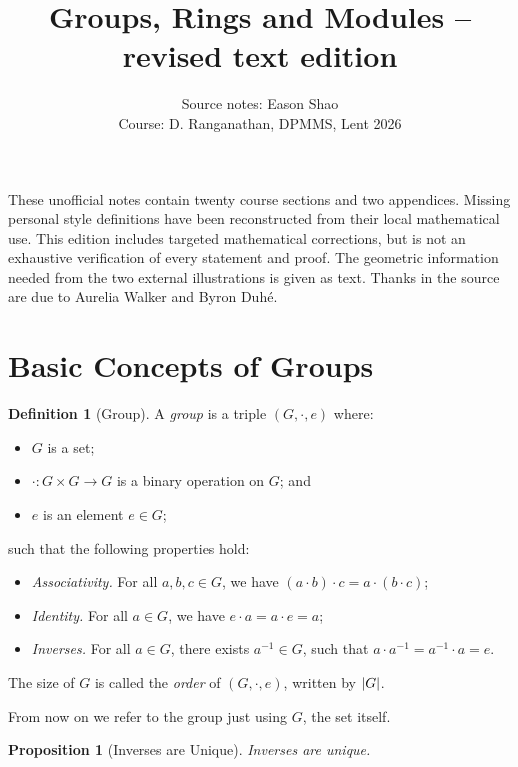 \documentclass{article}
\title{Groups, Rings and Modules -- revised text edition}
\author{Source notes: Eason Shao\\Course: D. Ranganathan, DPMMS, Lent 2026}
\date{}
\newtheorem{proposition}[theorem]{Proposition}
\theoremstyle{definition}
\newtheorem{definition}[theorem]{Definition}
\theoremstyle{remark}
\DeclarePairedDelimiter{\abs}{\lvert}{\rvert}
\newcommand{\pqty}[1]{\left(#1\right)}
\newcommand{\functiondomain}[3]{#1:#2\to #3}
\newcommand{\inverse}{^{-1}}
\begin{document}
\maketitle
These unofficial notes contain twenty course sections and two appendices. Missing personal style definitions have been reconstructed from their local mathematical use. This edition includes targeted mathematical corrections, but is not an exhaustive verification of every statement and proof. The geometric information needed from the two external illustrations is given as text. Thanks in the source are due to Aurelia Walker and Byron Duh\'{e}.
\tableofcontents
\section{Basic Concepts of Groups}

\begin{definition}[Group]
    \label{def:group}%
    A \emph{group} is a triple \(\pqty{G, \cdot, e}\) where:
    \begin{itemize}
        \item \(G\) is a set;
        \item \(\functiondomain{\cdot}{G \times G}{G}\) is a binary operation on \(G\); and
        \item \(e\) is an element \(e \in G\);
    \end{itemize}
    such that the following properties hold:
    \begin{itemize}
        \item \emph{Associativity.} For all \(a, b, c \in G\), we have \(\pqty{a \cdot b} \cdot c = a \cdot \pqty{b \cdot c}\);
        \item \emph{Identity.} For all \(a \in G\), we have \(e \cdot a = a \cdot e = a\);
        \item \emph{Inverses.} For all \(a \in G\), there exists \(a \inverse \in G\), such that \(a \cdot a \inverse = a \inverse \cdot a = e\).
    \end{itemize}

    The size of \(G\) is called the \emph{order} of \(\pqty{G, \cdot, e}\), written by \(\abs{G}\).
\end{definition}

From now on we refer to the group just using \(G\), the set itself.

\begin{proposition}[Inverses are Unique]
    \label{prop:inverses-unique}%
    Inverses are unique.
\end{proposition}
\end{document}
